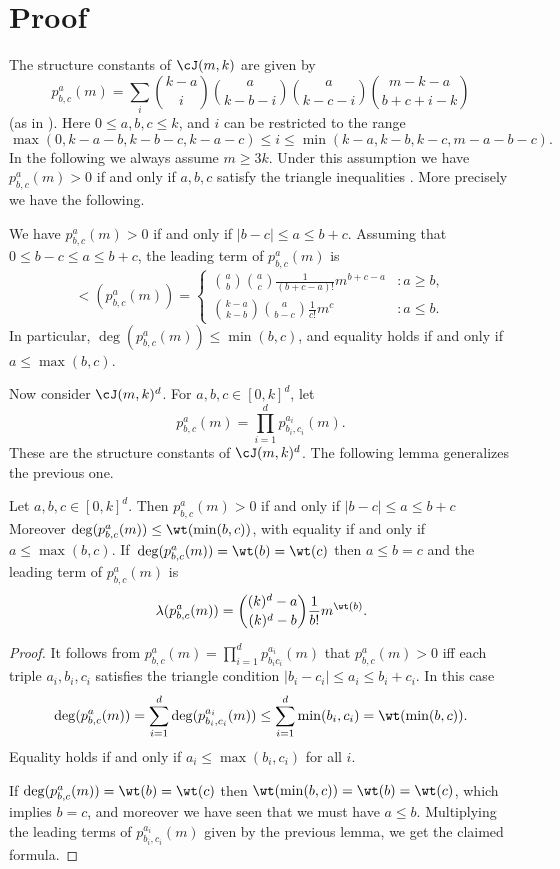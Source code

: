 \section{Proof}

The structure constants of $\cJ(m,k)$ are given by
\[
    p_{b,c}^a(m) = \sum_{i} \binom{k-a}{i}\binom{a}{k-b-i}\binom{a}{k-c-i} \binom{m-k-a}{b+c+i-k}
\]
(as in \cite{E,KK}).
Here $0 \leq a, b, c \leq k$, and $i$ can be restricted to the range
\[
    \max(0,k-a-b,k-b-c,k-a-c) \leq i \leq \min(k-a,k-b,k-c, m-a-b-c).
\]
In the following we always assume $m \geq 3k$. Under this assumption we have $p_{b,c}^a(m) > 0$ if and only if $a,b,c$ satisfy the triangle inequalities \cite[Lemma~4.1]{E}.
More precisely we have the following.

\begin{lemma}
    We have $p^a_{b, c}(m) > 0$ if and only if $|b - c| \leq a \leq b + c$. 
    Assuming that~$0 \leq b - c \leq a \leq b + c$, the leading term of $p^a_{b,c}(m)$ is
    \[
        \lt(p_{b,c}^a(m)) = \begin{cases}
        \binom{a}{b}\binom{a}{c}\frac{1}{(b+c - a)!} m^{b+c-a} &: a \geq b,\\
        \binom{k-a}{k-b}\binom{a}{b-c}\frac{1}{c!} m^{c} &: a\leq b.
        \end{cases}
    \]
In particular, $\deg(p_{b,c}^a(m))\leq \min(b,c)$, and equality holds if and only if $a \leq \max(b,c)$.
\end{lemma}

Now consider $\cJ(m, k)^d$.
For $a, b, c \in [0,k]^d$, let
\[
    p^a_{b,c}(m) = \prod_{i=1}^d p^{a_i}_{b_i,c_i}(m).
\]
These are the structure constants of $\cJ(m, k)^d$.
The following lemma generalizes the previous one.

\begin{lemma}
    Let $a,b,c\in[0,k]^d$.
    Then $p^a_{b,c}(m) > 0$ if and only if $|b-c| \leq a \leq b + c$
    Moreover $\deg(p_{b,c}^a(m)) \leq \wt(\min(b, c))$, with equality if and only if $a \leq \max(b, c)$.
    If~$\deg(p_{b,c}^a(m)) = \wt(b) = \wt(c)$ then $a \leq b = c$ and the leading term of $p^a_{b,c}(m)$ is
    \[
        \lambda(p^a_{b,c}(m))
        = \binom{(k)^d - a}{(k)^d - b} \frac{1}{b!} m^{\wt(b)}.
    \]
\end{lemma}
\begin{proof}
    It follows from $p_{b,c}^a(m) = \prod_{i=1}^d p_{b_i c_i}^{a_i}(m)$ that $p_{b,c}^a(m)>0$ iff each triple $a_i,b_i,c_i$ satisfies the triangle condition $|b_i-c_i|\leq a_i \leq b_i+c_i$. In this case
    \[
        \deg(p_{b,c}^a(m)) = \sum_{i=1}^d \deg(p_{b_i, c_i}^{a_i}(m))\leq \sum_{i=1}^d\min(b_i,c_i) = \wt(\min(b, c)).
    \]
    Equality holds if and only if $a_i \leq \max(b_i, c_i)$ for all $i$.
    
    If $\deg(p_{b,c}^a(m)) = \wt(b) = \wt(c)$ then $\wt(\min(b, c)) = \wt(b) = \wt(c)$, which implies $b = c$, and moreover we have seen that we must have $a \leq b$.
    Multiplying the leading terms of $p^{a_i}_{b_i,c_i}(m)$ given by the previous lemma, we get the claimed formula.
\end{proof}


